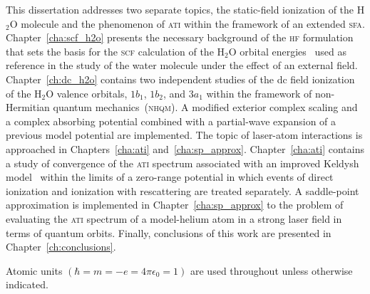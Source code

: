This dissertation addresses two separate topics, the static-field
ionization of the H$_{2}$O molecule and the phenomenon of \textsc{ati}
within the framework of an extended
\textsc{sfa}. Chapter~\ref{cha:scf_h2o} presents the necessary
background of the \textsc{hf} formulation that sets the basis for the
\textsc{scf} calculation of the H$_{2}$O orbital
energies~\cite{Moccia_1964} used as reference in the study of the
water molecule under the effect of an external
field. Chapter~\ref{ch:dc_h2o} contains two independent studies of the
dc field ionization of the H$_{2}$O valence orbitals, $1b_{1}$,
$1b_{2}$, and $3a_{1}$ within the framework of non-Hermitian quantum
mechanics~(\textsc{nhqm}). A modified exterior complex scaling and a
complex absorbing potential combined with a partial-wave expansion of
a previous model potential are implemented. The topic of laser-atom
interactions is approached in Chapters~\ref{cha:ati}
and~\ref{cha:sp_approx}. Chapter~\ref{cha:ati} contains a study of
convergence of the \textsc{ati} spectrum associated with an improved
Keldysh model~\cite{Kopold_1997sfa} within the limits of a zero-range
potential in which events of direct ionization and ionization with
rescattering are treated separately. A saddle-point approximation is
implemented in Chapter~\ref{cha:sp_approx} to the problem of
evaluating the \textsc{ati} spectrum of a model-helium atom in a
strong laser field in terms of quantum orbits. Finally, conclusions of
this work are presented in Chapter~\ref{ch:conclusions}.

Atomic units $(\hbar = m = -e = 4\pi\epsilon_{0} = 1)$ are used
throughout unless otherwise indicated.
































